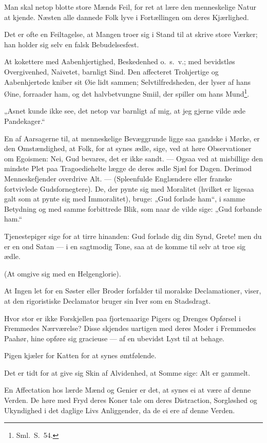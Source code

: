 \documentclass[12pt]{article}
\newcommand{\opage}[1]{\marginnote{\footnotesize\textit{[#1]}}}
\begin{document}
Man skal netop blotte store Mænds Feil, for ret at lære den menneskelige Natur at kjende. Næsten alle dannede Folk lyve i Fortællingen om deres Kjærlighed.

Det er ofte en Feiltagelse, at Mangen troer sig i Stand til at skrive store Værker; han holder sig selv en falsk Bebudelsesfest.

At kokettere med Aabenhjertighed, Beskedenhed o.\ s.\ v.; med bevidstløs Overgivenhed, Naivetet, barnligt Sind. Den affecteret Trohjertige og Aabenhjertede kniber sit Øie lidt sammen; Selvtilfredsheden, der lyser af hans Øine, forraader ham, og det halvbetvungne Smiil, der spiller om hans Mund\footnote{Sml.\ S.\ 54.}.

„Asnet kunde ikke see, det netop var barnligt af mig, at jeg gjerne vilde æde Pandekager.``

En af Aarsagerne til, at menneskelige Bevæggrunde ligge saa gandske i Mørke, er den Omstændighed, at Folk, for at synes ædle, sige, ved at høre Observationer om Egoismen: Nei, Gud bevares, det er ikke sandt. --- Ogsaa ved at misbillige den mindste Plet paa Tragoediehelte lægge de deres ædle Sjæl for Dagen. Derimod Menneskefjender overdrive Alt. --- (Spleenfulde Englændere eller franske fortvivlede Gudsfornegtere). \opage{179}De, der pynte sig med Moralitet (hvilket er ligesaa galt som at pynte sig med Immoralitet), bruge: „Gud forlade ham``, i samme Betydning og med samme forbittrede Blik, som naar de vilde sige: „Gud forbande ham.``

Tjenestepiger sige for at tirre hinanden: Gud forlade dig din Synd, Grete! men du er en ond Satan --- i en sagtmodig Tone, saa at de komme til selv at troe sig ædle.

(At omgive sig med en Helgenglorie).

At Ingen let for en Søster eller Broder forfalder til moralske Declamationer, viser, at den rigoristiske Declamator bruger sin Iver som en Stadsdragt.

Hvor stor er ikke Forskjellen paa fjortenaarige Pigers og Drenges Opførsel i Fremmedes Nærværelse? Disse skjendes uartigen med deres Moder i Fremmedes Paahør, hine opføre sig gracieuse --- af en ubevidst Lyst til at behage.

Pigen kjæler for Katten for at synes ømtfølende.

Det er tidt for at give sig Skin af Alvidenhed, at Somme sige: Alt er gammelt.

En Affectation hos lærde Mænd og Genier er det, at synes ei at være af denne Verden. De høre med Fryd deres Koner tale om deres Distraction, Sorgløshed og Ukyndighed i det daglige Livs Anliggender, da de ei ere af denne Verden.
\end{document}
